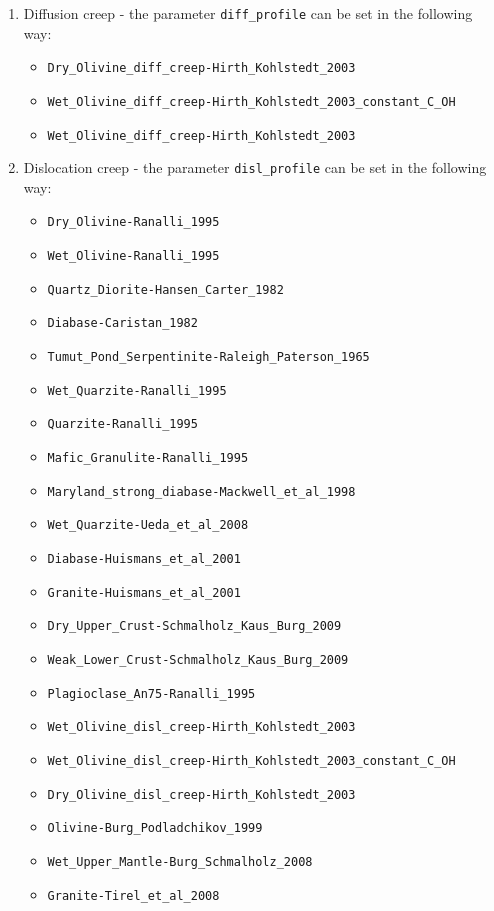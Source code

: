 \documentclass[a4paper,11pt]{article}
\begin{document}
\begin{enumerate}

\item Diffusion creep - the parameter \texttt{diff\_profile} can be set in the following way:
\begin{itemize}
\item \texttt{Dry\_Olivine\_diff\_creep-Hirth\_Kohlstedt\_2003}
\item \texttt{Wet\_Olivine\_diff\_creep-Hirth\_Kohlstedt\_2003\_constant\_C\_OH}
\item \texttt{Wet\_Olivine\_diff\_creep-Hirth\_Kohlstedt\_2003}
\end{itemize}

\item Dislocation creep - the parameter \texttt{disl\_profile} can be set in the following way:
\begin{itemize}
\item \texttt{Dry\_Olivine-Ranalli\_1995}
\item \texttt{Wet\_Olivine-Ranalli\_1995}
\item \texttt{Quartz\_Diorite-Hansen\_Carter\_1982}
\item \texttt{Diabase-Caristan\_1982}
\item \texttt{Tumut\_Pond\_Serpentinite-Raleigh\_Paterson\_1965}
\item \texttt{Wet\_Quarzite-Ranalli\_1995}
\item \texttt{Quarzite-Ranalli\_1995}
\item \texttt{Mafic\_Granulite-Ranalli\_1995}
\item \texttt{Maryland\_strong\_diabase-Mackwell\_et\_al\_1998}
\item \texttt{Wet\_Quarzite-Ueda\_et\_al\_2008}
\item \texttt{Diabase-Huismans\_et\_al\_2001}
\item \texttt{Granite-Huismans\_et\_al\_2001}
\item \texttt{Dry\_Upper\_Crust-Schmalholz\_Kaus\_Burg\_2009}
\item \texttt{Weak\_Lower\_Crust-Schmalholz\_Kaus\_Burg\_2009}
\item \texttt{Plagioclase\_An75-Ranalli\_1995}
\item \texttt{Wet\_Olivine\_disl\_creep-Hirth\_Kohlstedt\_2003}
\item \texttt{Wet\_Olivine\_disl\_creep-Hirth\_Kohlstedt\_2003\_constant\_C\_OH}
\item \texttt{Dry\_Olivine\_disl\_creep-Hirth\_Kohlstedt\_2003}
\item \texttt{Olivine-Burg\_Podladchikov\_1999}
\item \texttt{Wet\_Upper\_Mantle-Burg\_Schmalholz\_2008}
\item \texttt{Granite-Tirel\_et\_al\_2008}
\end{itemize}


\end{enumerate}
\end{document}
